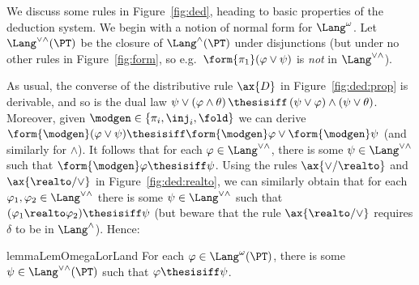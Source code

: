 We discuss some rules in Figure~\ref{fig:ded},
heading to basic properties of the deduction system.
We begin with a notion of normal form for $\Lang^\omega$.
Let $\Lang^{\lor\land}(\PT)$ be the closure of
$\Lang^\land(\PT)$ under disjunctions
(but under no other rules in Figure~\ref{fig:form},
so e.g.\ $\form{\pi_1}(\varphi \lor \psi)$ is \emph{not} in
$\Lang^{\lor\land}$).

As usual,
the converse of the distributive rule $\ax{D}$
in Figure~\ref{fig:ded:prop} is derivable,
and so is the dual law
\(
  \psi \lor (\varphi \land \theta)
  \,\thesisiff\,
  (\psi \lor \varphi) \land (\psi \lor \theta)
\).
Moreover, given $\modgen \in \{\pi_i,\inj_i,\fold\}$
we can derive
\(
  \form{\modgen}(\varphi \lor \psi)
  \thesisiff
  \form{\modgen}\varphi \lor \form{\modgen}\psi
\)
(and similarly for $\land$).
It follows that for each $\varphi \in \Lang^{\lor\land}$,
there is some $\psi \in \Lang^{\lor\land}$
such that $\form{\modgen}\varphi \thesisiff \psi$.
Using the rules $\ax{\lor/{\realto}}$
and $\ax{{\realto}/\lor}$ in Figure~\ref{fig:ded:realto},
we can similarly obtain that for each
$\varphi_1, \varphi_2 \in \Lang^{\lor\land}$
there is some $\psi \in \Lang^{\lor\land}$
such that
$(\varphi_1 \realto \varphi_2) \thesisiff \psi$
(but beware that the rule $\ax{{\realto}/\lor}$ requires
$\delta$ to be in $\Lang^\land$).
Hence:



\begin{restatable}{lemma}{LemOmegaLorLand}
\label{lem:ded:omegalorland}
For each $\varphi \in \Lang^\omega(\PT)$,
there is some $\psi \in \Lang^{\lor\land}(\PT)$
such that $\varphi \thesisiff \psi$.
\end{restatable}


